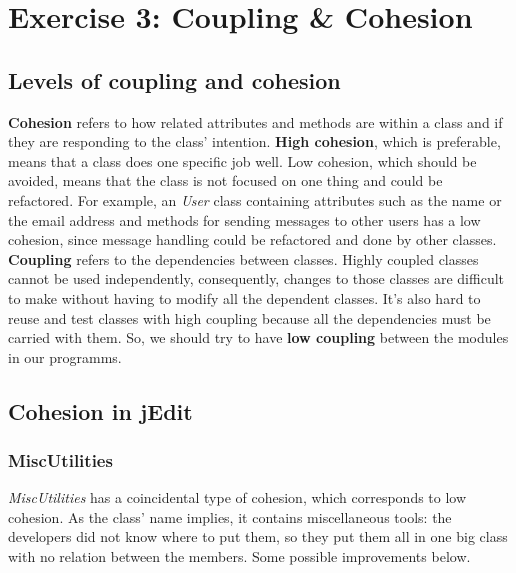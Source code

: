 \section{Exercise 3: Coupling \& Cohesion}

\subsection{Levels of coupling and cohesion}

\textbf{Cohesion} refers to how related attributes and methods are
within a class and if they are responding to the class' intention.
\textbf{High cohesion}, which is preferable, means that a class does one
specific job well. Low cohesion, which should be avoided, means that the
class is not focused on one thing and could be refactored. For example,
an \emph{User} class containing attributes such as the name or the email
address and methods for sending messages to other users has a low
cohesion, since message handling could be refactored and done by other
classes.\\

\textbf{Coupling} refers to the dependencies between classes. Highly
coupled classes cannot be used independently, consequently, changes to
those classes are difficult to make without having to modify all the
dependent classes. It's also hard to reuse and test classes with high
coupling because all the dependencies must be carried with them. So, we
should try to have \textbf{low coupling} between the modules in our
programms.

\subsection{Cohesion in jEdit}

\subsubsection{MiscUtilities}

\emph{MiscUtilities} has a coincidental type of cohesion, which
corresponds to low cohesion. As the class' name implies, it contains
miscellaneous tools: the developers did not know where to put them, so
they put them all in one big class with no relation between the members.
Some possible improvements below.

